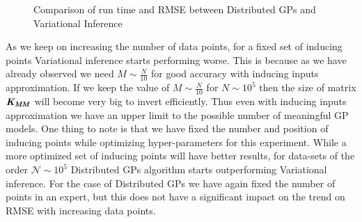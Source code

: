 \begin{figure}[!ht]
  \centering
  \quad
  \caption{Comparison of run time and RMSE between Distributed GPs and Variational Inference}\label{fig:comparisonOfDGPvsVARGP}
\end{figure}

As we keep on increasing the number of data points, for a fixed set of inducing points Variational inference starts performing worse. This is because as we have already observed we need $M \sim \frac{N}{10}$ for good accuracy with inducing inputs approximation. If we keep the value of $M \sim \frac{N}{10}$ for $N \sim 10^5$ then the size of matrix $\bm{\mathit{K_{MM}}}$ will become very big to invert efficiently. Thus even with inducing inputs approximation we have an upper limit to the possible number of meaningful GP models. One thing to note is that we have fixed the number and position of inducing points while optimizing hyper-parameters for this experiment. While a more optimized set of inducing points will have better results, for data-sets of the order $\mathcal{N} \sim 10^5$ Distributed GPs algorithm starts outperforming Variational inference. For the case of Distributed GPs we have again fixed the number of points in an expert, but this does not have a significant impact on the trend on RMSE with increasing data points. 

